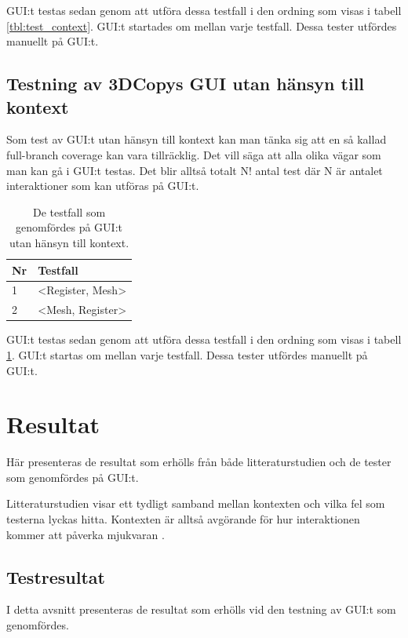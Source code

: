 GUI:t testas sedan genom att utföra dessa testfall i den ordning som visas i tabell \ref{tbl:test_context}. GUI:t startades om mellan varje testfall. Dessa tester utfördes manuellt på GUI:t.

\subsection{Testning av 3DCopys GUI utan hänsyn till kontext}

Som test av GUI:t utan hänsyn till kontext kan man tänka sig att en så kallad full-branch coverage kan vara tillräcklig. Det vill säga att alla olika vägar som man kan gå i GUI:t testas. Det blir alltså totalt N! antal test där N är antalet interaktioner som kan utföras på GUI:t.

\begin{table}[h]
	\caption{De testfall som genomfördes på GUI:t utan hänsyn till kontext.}
	\label{tbl:test_nocontext}
	\centering
	\begin{tabular}{|l|l|}
		\hline
		\textbf{Nr} & \textbf{Testfall} \\
		\hline
		1 & <Register, Mesh> \\
		\hline
		2 & <Mesh, Register> \\
		\hline
	\end{tabular}
\end{table}

GUI:t testas sedan genom att utföra dessa testfall i den ordning som visas i tabell \ref{tbl:test_nocontext}. GUI:t startas om mellan varje testfall. Dessa tester utfördes manuellt på GUI:t.

\section{Resultat}
\label{sec:results-holmberg}

Här presenteras de resultat som erhölls från både litteraturstudien och de tester som genomfördes på GUI:t.

Litteraturstudien visar ett tydligt samband mellan kontexten och vilka fel som testerna lyckas hitta. Kontexten är alltså avgörande för hur interaktionen kommer att påverka mjukvaran \cite{yuan2011gui}. 

\subsection{Testresultat}

I detta avsnitt presenteras de resultat som erhölls vid den testning av GUI:t som genomfördes.

